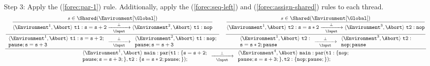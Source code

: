 \noindent
Step 3: Apply the (\ref{forec:par-1}) rule. Additionally, apply 
the (\ref{forec:seq-left}) and (\ref{forec:assign-shared})
rules to each thread.
\begin{equation*}
	\frac{
		\dfrac{
			\dfrac{
					s \in \Shared(\Environment[\Global])
				}{
					\langle \Environment^1, \Abort \rangle ~ \mathtt{t1: s=s+2}
						\xrightarrow[~~\Input~~]{\bot} 
					\langle \Environment^2, \Abort \rangle ~ \mathtt{t1: nop}
				}
			}{
				\begin{array}{l}
					\langle \Environment^1, \Abort \rangle ~ \mathtt{t1: s=s+2;}	\\
					\mathtt{pause; s=s+3}											\\
				\end{array}
					\xrightarrow[~~\Input~~]{\bot} 
				\begin{array}{l}
					\langle \Environment^2, \Abort \rangle ~ \mathtt{t1: nop;}		\\
					\mathtt{pause; s=s+3}											\\
				\end{array}
			}
			\quad
		\dfrac{
			\dfrac{
					s \in \Shared(\Environment[\Global])
				}{
					\langle \Environment^1, \Abort \rangle ~ \mathtt{t2: s=s*2}
						\xrightarrow[~~\Input~~]{\bot} 
					\langle \Environment^3, \Abort \rangle ~ \mathtt{t2: nop}
				}
			}{
				\begin{array}{l}
					\langle \Environment^1, \Abort \rangle ~ \mathtt{t2: }		\\
					\mathtt{s=s*2; pause}										\\
				\end{array}
					\xrightarrow[~~\Input~~]{\bot} 
				\begin{array}{l}
					\langle \Environment^3, \Abort \rangle ~ \mathtt{t2: }		\\
					\mathtt{nop; pause}											\\
				\end{array}
			}
		}{
			\begin{array}{l}
				\langle \Environment^1, \Abort \rangle ~ \mathtt{main: par( t1:\{s=s+2;}	\\
				\mathtt{pause; s=s+3;\}, t2:\{s=s*2; pause;\} );}							\\
			\end{array}
				\xrightarrow[~~\Input~~]{\bot} 
			\begin{array}{l}
				\langle \Environment^4, \Abort \rangle ~ \mathtt{main: par( t1:\{nop;}		\\
				\mathtt{pause; s=s+3;\}, t2:\{nop; pause;\} );}								\\
			\end{array}
		}
\end{equation*}

